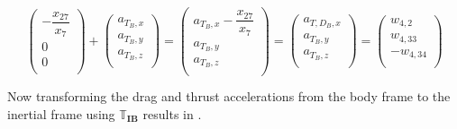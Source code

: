 \begin{equation} \label{eq:DandTBody}
\begin{pmatrix}
-\dfrac{x_{27}}{x_{7}}\\
0\\
0\\
\end{pmatrix}
+
\begin{pmatrix}
a_{T_{B},x}\\
a_{T_{B},y}\\
a_{T_{B},z}\\
\end{pmatrix}
=
\begin{pmatrix}
a_{T_{B},x}-\dfrac{x_{27}}{x_{7}}\\
a_{T_{B},y}\\
a_{T_{B},z}\\
\end{pmatrix}
=
\begin{pmatrix}
a_{T,D_{B},x}\\
a_{T_{B},y}\\
a_{T_{B},z}\\
\end{pmatrix}
=
\begin{pmatrix}
w_{4,2}\\
w_{4,33}\\
-w_{4,34}\\
\end{pmatrix}
\end{equation}

Now transforming the drag and thrust accelerations from the body frame to the inertial frame using $\mathbb{T}_{\mathbf{IB}}$ results in .


